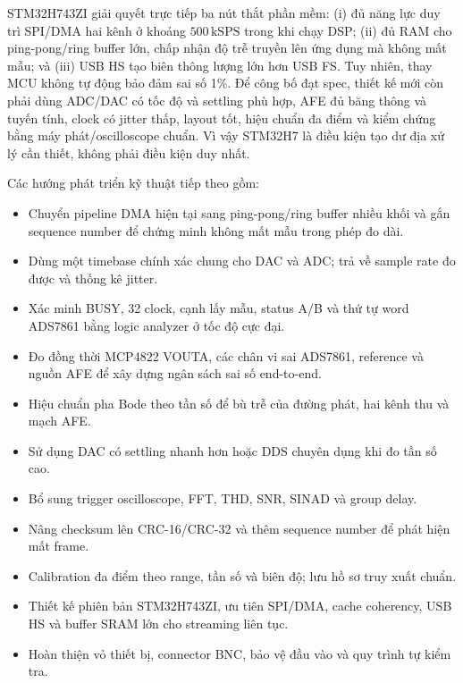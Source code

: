 \documentclass[12pt,a4paper]{report}
\newcommand{\unit}[1]{\,\mathrm{#1}}
\begin{document}
STM32H743ZI giải quyết trực tiếp ba nút thắt phần mềm: (i) đủ năng lực duy trì SPI/DMA hai kênh ở khoảng $500\unit{kSPS}$ trong khi chạy DSP; (ii) đủ RAM cho ping-pong/ring buffer lớn, chấp nhận độ trễ truyền lên ứng dụng mà không mất mẫu; và (iii) USB HS tạo biên thông lượng lớn hơn USB FS. Tuy nhiên, thay MCU không tự động bảo đảm sai số 1\%. Để công bố đạt spec, thiết kế mới còn phải dùng ADC/DAC có tốc độ và settling phù hợp, AFE đủ băng thông và tuyến tính, clock có jitter thấp, layout tốt, hiệu chuẩn đa điểm và kiểm chứng bằng máy phát/oscilloscope chuẩn. Vì vậy STM32H7 là điều kiện tạo dư địa xử lý cần thiết, không phải điều kiện duy nhất.

Các hướng phát triển kỹ thuật tiếp theo gồm:
\begin{itemize}
    \item Chuyển pipeline DMA hiện tại sang ping-pong/ring buffer nhiều khối và gắn sequence number để chứng minh không mất mẫu trong phép đo dài.
    \item Dùng một timebase chính xác chung cho DAC và ADC; trả về sample rate đo được và thống kê jitter.
    \item Xác minh BUSY, 32 clock, cạnh lấy mẫu, status A/B và thứ tự word ADS7861 bằng logic analyzer ở tốc độ cực đại.
    \item Đo đồng thời MCP4822 VOUTA, các chân vi sai ADS7861, reference và nguồn AFE để xây dựng ngân sách sai số end-to-end.
    \item Hiệu chuẩn pha Bode theo tần số để bù trễ của đường phát, hai kênh thu và mạch AFE.
    \item Sử dụng DAC có settling nhanh hơn hoặc DDS chuyên dụng khi đo tần số cao.
    \item Bổ sung trigger oscilloscope, FFT, THD, SNR, SINAD và group delay.
    \item Nâng checksum lên CRC-16/CRC-32 và thêm sequence number để phát hiện mất frame.
    \item Calibration đa điểm theo range, tần số và biên độ; lưu hồ sơ truy xuất chuẩn.
    \item Thiết kế phiên bản STM32H743ZI, ưu tiên SPI/DMA, cache coherency, USB HS và buffer SRAM lớn cho streaming liên tục.
    \item Hoàn thiện vỏ thiết bị, connector BNC, bảo vệ đầu vào và quy trình tự kiểm tra.
\end{itemize}
\end{document}
